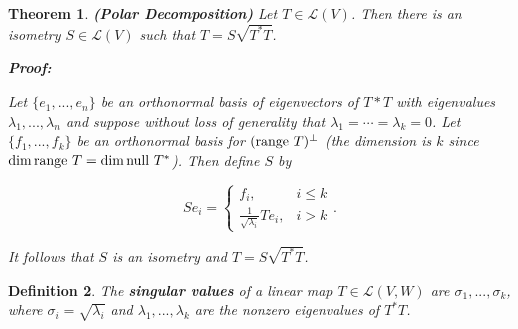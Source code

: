 \documentclass{article}
\theoremstyle{colontheorem}
\newtheorem{theorem}{Theorem}[section]
\newtheorem{definition}[theorem]{Definition}
\newcommand{\Null}{\textnormal{null }}
\newcommand{\Range}{\textnormal{range }}
\newenvironment{Theorem}
{
	\begin{mdframed}[backgroundcolor=TheoremOrange!10]
	\begin{theorem}
}
{
	\end{theorem}
	\end{mdframed}
	
	\vspace{.15in}
}
\newenvironment{Def}
{
	\begin{mdframed}[backgroundcolor=DefGreen!10]
	\begin{definition}
}
{
	\end{definition}
	\end{mdframed}
	
	\vspace{.15in}
}
\newenvironment{Proof}
{
	\begin{mdframed}[backgroundcolor=ProofPurple!10]
	\textbf{Proof:}%
}
{
	\end{mdframed}
	
	\vspace{.085in}
}
\begin{document}
\begin{Theorem}
	
	\textbf{(Polar Decomposition)} Let $T \in \mathcal{L}(V)$. Then there is an isometry $S \in \mathcal{L}(V)$ such that $T = S\sqrt{T^* T}$.
	
	\begin{Proof}
		Let $\{e_1, ..., e_n\}$ be an orthonormal basis of eigenvectors of $T*T$ with eigenvalues $\lambda_1, ..., \lambda_n$ and suppose without loss of generality that $\lambda_1 = \cdots = \lambda_k = 0$. Let $\{f_1, ..., f_k\}$ be an orthonormal basis for $(\Range T)^\perp$ (the dimension is $k$ since $\dim \Range T = \dim \Null T^*$). Then define $S$ by
		
		$$
		Se_i = \begin{cases} 
			f_i, & i \leq k \\
			\frac{1}{\sqrt{\lambda_i}}Te_i, & i > k
		\end{cases}.
		$$
		
		It follows that $S$ is an isometry and $T = S \sqrt{T^* T}$.
		
	\end{Proof}
	
\end{Theorem}



\begin{Def}
	
	The \textbf{singular values} of a linear map $T \in \mathcal{L}(V, W)$ are $\sigma_1, ..., \sigma_k$, where $\sigma_i = \sqrt{\lambda_i}$ and $\lambda_1, ..., \lambda_k$ are the nonzero eigenvalues of $T^* T$.
	
\end{Def}
\end{document}
